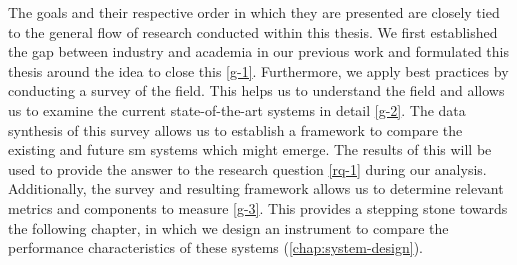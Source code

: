 The goals and their respective order in which they are  presented are closely tied to the general flow of research conducted within this thesis. We first established the gap between industry and academia in our previous work and formulated this thesis around the idea to close this \ref{g-1}. Furthermore, we apply best practices by conducting a survey of the field. This helps us to understand the field and allows us to examine the current state-of-the-art systems in detail \ref{g-2}. The data synthesis of this survey allows us to establish a framework to compare the existing and future \gls{sm} systems which might emerge. The results of this will be used to provide the answer to the research question \ref{rq-1} during our analysis. Additionally, the survey and resulting framework allows us to determine relevant metrics and components to measure \ref{g-3}. This provides a stepping stone towards the following chapter, in which we design an instrument to compare the performance characteristics of these systems (\cref{chap:system-design}).